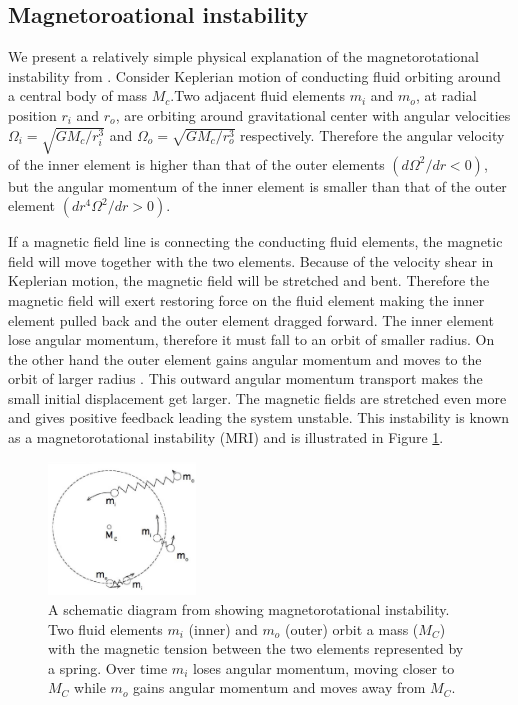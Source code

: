 \documentclass{jfm}
\begin{document}
%
%
\subsection{Magnetoroational instability}
We present a relatively simple physical explanation of the magnetorotational 
instability from \cite{Balbus2011}. Consider Keplerian motion of conducting 
fluid orbiting around a central body of mass $M_c$.Two adjacent fluid elements 
$m_i$ and $m_o$, at radial position $r_i$ and $r_o$, are orbiting around 
gravitational center with angular velocities $\Omega_i=\sqrt{GM_c / r_i^{3}}$ 
and $\Omega_o=\sqrt{GM_c / r_o^{3}}$ respectively. Therefore the angular 
velocity of the inner element is higher than that of the outer elements 
$\left(d \Omega^2 / dr < 0 \right)$, but the angular momentum of the inner 
element is smaller than that of the outer element 
$\left(d r^4\Omega^2 / dr > 0 \right)$.

If a magnetic field line is connecting the conducting fluid elements, the 
magnetic field will move together with the two elements. Because of the velocity
shear in Keplerian motion, the magnetic field will be stretched and bent. 
Therefore the magnetic field will exert restoring force on the fluid element 
making the inner element pulled back and the outer element dragged forward. 
The inner element lose angular momentum, therefore it must fall to an orbit of
smaller radius. On the other hand the outer element gains angular momentum and
moves to the orbit of larger radius \citep{Balbus2011}. This 
outward angular momentum transport makes the small initial displacement get 
larger. The magnetic fields are stretched even more and gives positive feedback
leading the system unstable. This instability is known as a magnetorotational 
instability (MRI) and is illustrated in Figure \ref{fig:mri}.

\begin{figure}[t]
    \centering
    \includegraphics[width=0.35\textwidth]{Balbus2009_diagram}
        \caption{A schematic diagram from \cite{Balbus2011} showing magnetorotational instability. Two fluid elements $m_i$ (inner) and $m_o$ (outer) orbit a mass ($M_C$) with the magnetic tension between the two elements represented by a spring. Over time $m_i$ loses angular momentum, moving closer to $M_C$ while $m_o$ gains angular momentum and moves away from $M_C$.}
        \label{fig:mri}
\end{figure}
\end{document}
